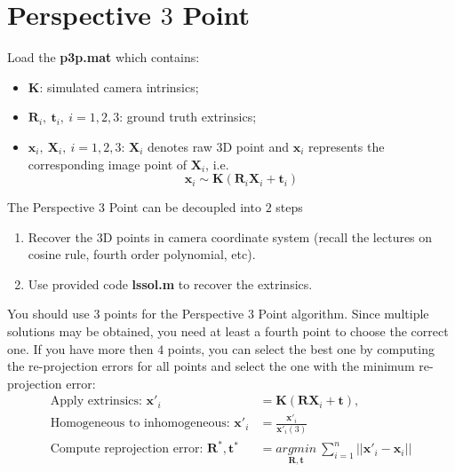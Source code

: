 \documentclass[a4paper]{article}
\begin{document}
\section{Perspective $3$ Point}
Load the \textbf{p3p.mat} which contains:
\begin{itemize}
\item $\mathbf{K}$: simulated camera intrinsics;
\item $\mathbf{R}_i,\ \mathbf{t}_i,\ i=1,2,3$: ground truth extrinsics;
\item $\mathbf{x}_i,\ \mathbf{X}_i,\ i=1,2,3$: $\mathbf{X}_i$ denotes raw $3$D point and $\mathbf{x}_i$ represents the corresponding image point of $\mathbf{X}_i$, i.e. $$\mathbf{x}_i \sim \mathbf{K}(\mathbf{R}_i\mathbf{X}_i+\mathbf{t}_i)$$
\end{itemize}
The Perspective $3$ Point can be decoupled into $2$ steps
\begin{enumerate}
\item Recover the $3$D points in camera coordinate system (recall the lectures on cosine rule, fourth order polynomial, etc).
\item Use provided code \textbf{lssol.m} to recover the extrinsics.
\end{enumerate}
You should use $3$ points for the Perspective $3$ Point algorithm. Since multiple solutions may be obtained, you need at least a fourth point to choose the correct one. If you have more then $4$ points, you can select the best one by computing the re-projection errors for all points and select the one with the minimum re-projection error:
\begin{align*}
\text{Apply extrinsics: }\mathbf{x}'_i&=\mathbf{K}(\mathbf{RX}_i+\mathbf{t}),\\
\text{Homogeneous to inhomogeneous: } \mathbf{x}'_i&= \frac{\mathbf{x}'_i}{\mathbf{x}'_i(3)}  \\
\text{Compute reprojection error: }\mathbf{R^*}, \mathbf{t^*}&=\underset{\mathbf{R}, \mathbf{t}}{argmin}\ \sum_{i=1}^{n}||\mathbf{x}'_i-\mathbf{x}_i||\\
\end{align*}
\end{document}
